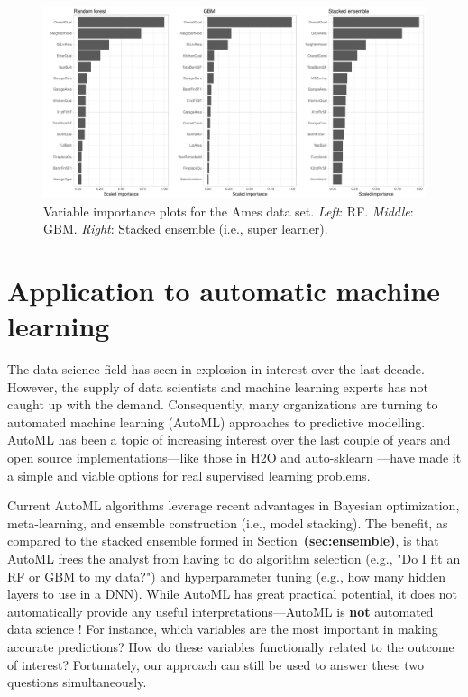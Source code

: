 \documentclass[12pt]{article}
\def\ref#1{\textbf{(#1)}}
\begin{document}
\begin{figure}[!htb]
  \centering
  \includegraphics[width=1.0\textwidth]{ames-ensemble-vip}
  \caption{Variable importance plots for the Ames data set. \textit{Left}: RF. \textit{Middle}: GBM. \textit{Right}: Stacked ensemble (i.e., super learner). \label{fig:ames-ensemble-vip}}
\end{figure}


\section{Application to automatic machine learning}
\label{sec:automl}

The data science field has seen in explosion in interest over the last decade. However, the supply of data scientists and machine learning experts has not caught up with the demand. Consequently, many organizations are turning to automated machine learning (AutoML) approaches to predictive modelling. AutoML has been a topic of increasing interest over the last couple of years and open source implementations---like those in H2O and auto-sklearn \citep{auto-sklearn}---have made it a simple and viable options for real supervised learning problems.

Current AutoML algorithms leverage recent advantages in Bayesian optimization, meta-learning, and ensemble construction (i.e., model stacking). The benefit, as compared to the stacked ensemble formed in Section~\ref{sec:ensemble}, is that AutoML frees the analyst from having to do algorithm selection (e.g., "Do I fit an RF or GBM to my data?") and hyperparameter tuning (e.g., how many hidden layers to use in a DNN). While AutoML has great practical potential, it does not automatically provide any useful interpretations---AutoML is \textbf{not} automated data science \citep{mayo_2017}! For instance, which variables are the most important in making accurate predictions? How do these variables functionally related to the outcome of interest? Fortunately, our approach can still be used to answer these two questions simultaneously.
\end{document}
